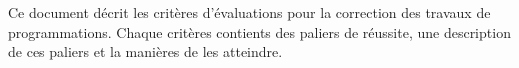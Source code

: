 Ce document décrit les critères d'évaluations pour la correction des travaux de programmations. Chaque critères contients des paliers de réussite, une description de ces paliers et la manières de les atteindre.